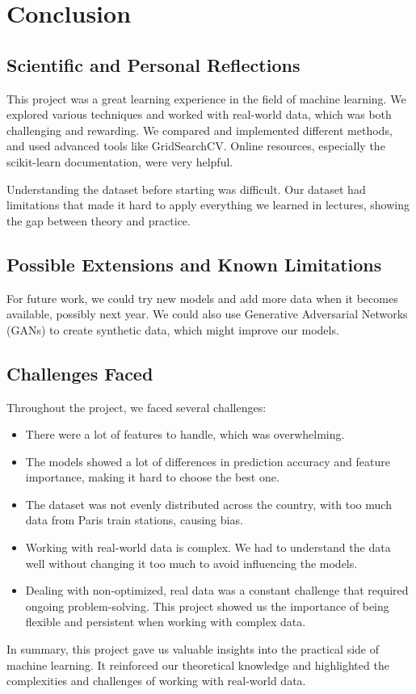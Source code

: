 \chapter{Conclusion}

\section{Scientific and Personal Reflections}
This project was a great learning experience in the field of machine learning. We explored various techniques and worked with real-world data, which was both challenging and rewarding. We compared and implemented different methods, and used advanced tools like GridSearchCV. Online resources, especially the scikit-learn documentation, were very helpful.

Understanding the dataset before starting was difficult. Our dataset had limitations that made it hard to apply everything we learned in lectures, showing the gap between theory and practice.

\section{Possible Extensions and Known Limitations}
For future work, we could try new models and add more data when it becomes available, possibly next year. We could also use Generative Adversarial Networks (GANs) to create synthetic data, which might improve our models.

\section{Challenges Faced}
Throughout the project, we faced several challenges:

\begin{itemize}
    \item There were a lot of features to handle, which was overwhelming.
    \item The models showed a lot of differences in prediction accuracy and feature importance, making it hard to choose the best one.
    \item The dataset was not evenly distributed across the country, with too much data from Paris train stations, causing bias.
    \item Working with real-world data is complex. We had to understand the data well without changing it too much to avoid influencing the models.
    \item Dealing with non-optimized, real data was a constant challenge that required ongoing problem-solving. This project showed us the importance of being flexible and persistent when working with complex data.
\end{itemize}

In summary, this project gave us valuable insights into the practical side of machine learning. It reinforced our theoretical knowledge and highlighted the complexities and challenges of working with real-world data.